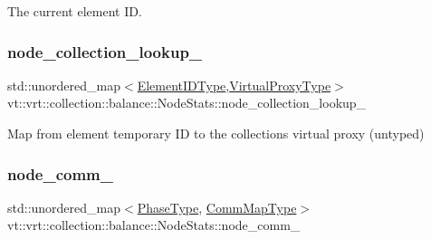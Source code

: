 The current element ID. 

\mbox{\label{structvt_1_1vrt_1_1collection_1_1balance_1_1_node_stats_ac21ddf1bec029ea8dde5a1b221db7c46}} 
\subsubsection{\texorpdfstring{node\+\_\+collection\+\_\+lookup\+\_\+}{node\_collection\_lookup\_}}
{\footnotesize\ttfamily std\+::unordered\+\_\+map$<$\hyperlink{namespacevt_1_1vrt_1_1collection_1_1balance_a14c8d2c972f2913aa3f1636e5be0a120}{Element\+I\+D\+Type},\hyperlink{namespacevt_a1b417dd5d684f045bb58a0ede70045ac}{Virtual\+Proxy\+Type}$>$ vt\+::vrt\+::collection\+::balance\+::\+Node\+Stats\+::node\+\_\+collection\+\_\+lookup\+\_\+\hspace{0.3cm}{\ttfamily [private]}}



Map from element temporary ID to the collection\textquotesingle{}s virtual proxy (untyped) 

\mbox{\label{structvt_1_1vrt_1_1collection_1_1balance_1_1_node_stats_ad07d8cd0a63ec07559711162e0da8157}} 
\subsubsection{\texorpdfstring{node\+\_\+comm\+\_\+}{node\_comm\_}}
{\footnotesize\ttfamily std\+::unordered\+\_\+map$<$\hyperlink{namespacevt_a46ce6733d5cdbd735d561b7b4029f6d7}{Phase\+Type}, \hyperlink{namespacevt_1_1vrt_1_1collection_1_1balance_a10860c956804d644db54a16012352728}{Comm\+Map\+Type}$>$ vt\+::vrt\+::collection\+::balance\+::\+Node\+Stats\+::node\+\_\+comm\+\_\+\hspace{0.3cm}{\ttfamily [private]}}



